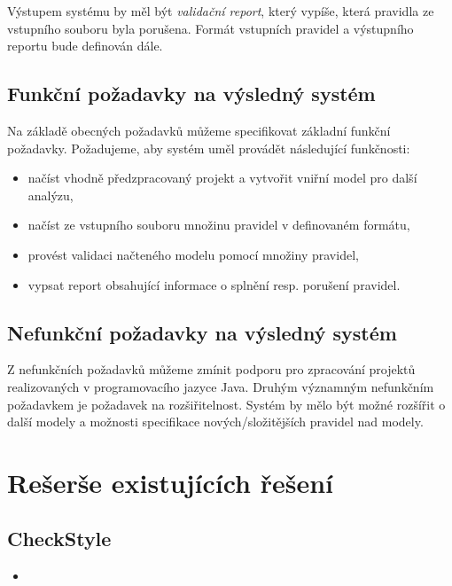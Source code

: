 Výstupem systému by měl být \emph{validační report}, který vypíše, která pravidla ze vstupního souboru byla porušena. Formát vstupních pravidel a výstupního reportu bude definován dále.

\subsection{Funkční požadavky na výsledný systém}

Na základě obecných požadavků můžeme specifikovat základní funkční požadavky. Požadujeme, aby systém uměl provádět následující funkčnosti:
\begin{itemize}
\item načíst vhodně předzpracovaný projekt a vytvořit vniřní model pro další analýzu,
\item načíst ze vstupního souboru množinu pravidel v definovaném formátu,
\item provést validaci načteného modelu pomocí množiny pravidel,
\item vypsat report obsahující informace o splnění resp. porušení pravidel.
\end{itemize}

\subsection{Nefunkční požadavky na výsledný systém}
Z nefunkčních požadavků můžeme zmínit podporu pro zpracování projektů realizovaných v programovacího jazyce Java. Druhým významným nefunkčním požadavkem je požadavek na rozšiřitelnost. Systém by mělo být možné rozšířit o další modely a možnosti specifikace nových/složitějších pravidel nad modely.

\section{Rešerše existujících řešení}
\label{requirements-existing_tools}


\subsection{CheckStyle}
\begin{itemize}
\item \cite{existingtools:checkstyle}
\end{itemize}

